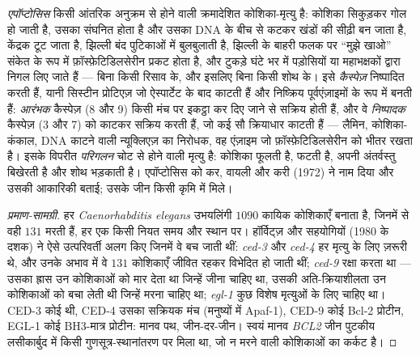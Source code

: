 \begin{definition}[एपॉप्टोसिस]\label{def:b3:cell-cycle-apoptosis:apoptosis}
\emph{एपॉप्टोसिस} किसी आंतरिक अनुक्रम से होने वाली क्रमादेशित
कोशिका-मृत्यु है: कोशिका सिकुड़कर गोल हो जाती है, उसका  संघनित
होता है और उसका DNA  के बीच से कटकर खंडों की सीढ़ी बन
जाता है, केंद्रक टूट जाता है, झिल्ली बंद पुटिकाओं में बुलबुलाती है,
झिल्ली के बाहरी फलक पर ``मुझे खाओ'' संकेत के रूप में
फ़ॉस्फ़ेटिडिलसेरीन प्रकट होता है, और टुकड़े घंटे भर में पड़ोसियों या
महाभक्षकों द्वारा निगल लिए जाते हैं --- बिना किसी रिसाव के, और इसलिए
बिना किसी शोथ के। इसे \emph{कैस्पेज़} निष्पादित करती हैं, यानी
सिस्टीन प्रोटिएज़ जो ऐस्पार्टेट के बाद काटती हैं और निष्क्रिय
पूर्वएंज़ाइमों के रूप में बनती हैं: \emph{आरंभक} कैस्पेज़ (8 और 9) किसी
मंच पर इकट्ठा कर दिए जाने से सक्रिय होती हैं, और वे
\emph{निष्पादक} कैस्पेज़ (3 और 7) को काटकर सक्रिय करती हैं, जो कई सौ
क्रियाधार काटती हैं --- लैमिन, कोशिका-कंकाल, DNA काटने वाली
न्यूक्लिएज़ का निरोधक, वह एंज़ाइम जो फ़ॉस्फ़ेटिडिलसेरीन को भीतर रखता है।
इसके विपरीत \emph{परिगलन} चोट से होने वाली मृत्यु है: कोशिका फूलती है,
फटती है, अपनी अंतर्वस्तु बिखेरती है और शोथ भड़काती है। एपॉप्टोसिस को
कर, वायली और करी (1972) ने नाम दिया और उसकी आकारिकी बताई; उसके जीन किसी
कृमि में मिले।
\end{definition}

\begin{proof}[प्रमाण-सामग्री]
हर \emph{Caenorhabditis elegans} उभयलिंगी $1090$ कायिक
कोशिकाएँ बनाता है, जिनमें से वही $131$ मरती हैं, हर एक किसी नियत समय
और स्थान पर। हॉर्विट्ज़ और सहयोगियों (1980 के दशक) ने ऐसे उत्परिवर्ती
अलग किए जिनमें वे बच जाती थीं: \emph{ced-3} और \emph{ced-4} हर मृत्यु
के लिए ज़रूरी थे, और उनके अभाव में वे $131$ कोशिकाएँ जीवित रहकर
विभेदित हो जाती थीं; \emph{ced-9} रक्षा करता था --- उसका ह्रास उन
कोशिकाओं को मार देता था जिन्हें जीना चाहिए था, उसकी अति-क्रियाशीलता उन
कोशिकाओं को बचा लेती थी जिन्हें मरना चाहिए था; \emph{egl-1} कुछ विशेष
मृत्युओं के लिए चाहिए था। CED-3 कोई  थी, CED-4 उसका
सक्रियक मंच (मनुष्यों में Apaf-1), CED-9 कोई Bcl-2 प्रोटीन, EGL-1 कोई
BH3-मात्र प्रोटीन: मानव पथ, जीन-दर-जीन। स्वयं मानव
\emph{BCL2} जीन पुटकीय लसीकार्बुद में किसी गुणसूत्र-स्थानांतरण पर मिला
था, जो न मरने वाली कोशिकाओं का कर्कट है।
\end{proof}

